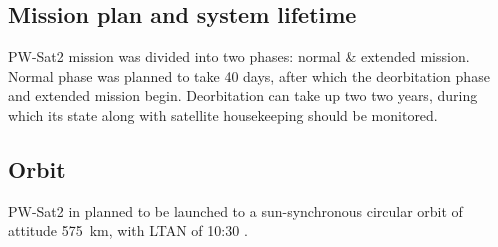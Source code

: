     \subsection{Mission plan and system lifetime}
        PW-Sat2 mission was divided into two phases: normal \& extended mission. Normal phase was planned to take 40 days, after which the deorbitation phase and extended mission begin. Deorbitation can  take up two two years, during which its state along with satellite housekeeping should be monitored.

    \subsection{Orbit}
        PW-Sat2 in planned to be launched to a sun-synchronous circular orbit of attitude \SI{575}{\kilo\meter}, with LTAN of 10:30 \cite{PWSAT_MA_CDR}.